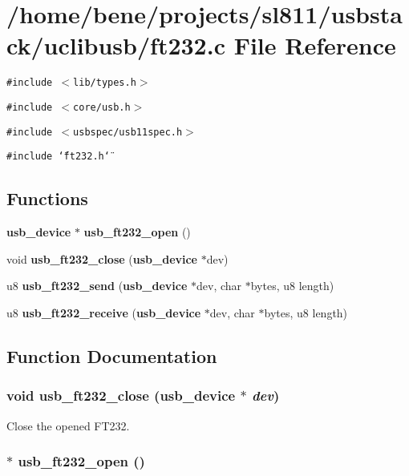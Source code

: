 \section{/home/bene/projects/sl811/usbstack/uclibusb/ft232.c File Reference}
\label{ft232_8c}
{\tt \#include $<$lib/types.h$>$}\par
{\tt \#include $<$core/usb.h$>$}\par
{\tt \#include $<$usbspec/usb11spec.h$>$}\par
{\tt \#include \char`\"{}ft232.h\char`\"{}}\par
\subsection*{Functions}
\begin{CompactItemize}
\item 
{\bf usb\_\-device} $\ast$ {\bf usb\_\-ft232\_\-open} ()
\item 
void {\bf usb\_\-ft232\_\-close} ({\bf usb\_\-device} $\ast$dev)
\item 
u8 {\bf usb\_\-ft232\_\-send} ({\bf usb\_\-device} $\ast$dev, char $\ast$bytes, u8 length)
\item 
u8 {\bf usb\_\-ft232\_\-receive} ({\bf usb\_\-device} $\ast$dev, char $\ast$bytes, u8 length)
\end{CompactItemize}


\subsection{Function Documentation}
\subsubsection{\setlength{\rightskip}{0pt plus 5cm}void usb\_\-ft232\_\-close ({\bf usb\_\-device} $\ast$ {\em dev})}\label{ft232_8c_8bde0055ce93f0aa39c74276c0c11228}


Close the opened FT232. 
\subsubsection{$\ast$ usb\_\-ft232\_\-open ()}\label{ft232_8c_03db6551dfa998017bb0d18fe2a4a48e}


